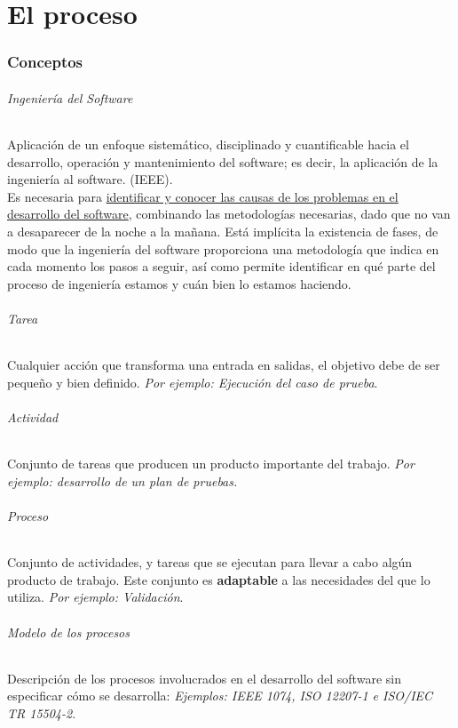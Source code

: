 \part{El proceso}

\section{Conceptos}

\paragraph{Ingeniería del Software} Aplicación de un enfoque sistemático, disciplinado y cuantificable hacia el desarrollo, operación y mantenimiento del software; es decir, la aplicación de la ingeniería al software. (IEEE).\\

Es necesaria para \uline{identificar y conocer las causas de los problemas en el desarrollo del software}, combinando las metodologías necesarias, dado que no van a desaparecer de la noche a la mañana. Está implícita la existencia de fases, de modo que la ingeniería del software proporciona una metodología que indica en cada momento los pasos a seguir, así como permite identificar en qué parte del proceso de ingeniería estamos y cuán bien lo estamos haciendo.

\paragraph{Tarea} Cualquier acción que transforma una entrada en salidas, el objetivo debe de ser pequeño y bien definido. \textit{Por ejemplo: Ejecución del caso de prueba}.


\paragraph{Actividad} Conjunto de tareas que producen un producto importante del trabajo. \textit{Por ejemplo: desarrollo de un plan de pruebas.}

\paragraph{Proceso} Conjunto de actividades, y tareas que se ejecutan para llevar a cabo algún producto de trabajo. Este conjunto es \textbf{adaptable} a las necesidades del que lo utiliza. \textit{Por ejemplo: Validación}.

\paragraph{Modelo de los procesos} Descripción de los procesos involucrados en el desarrollo del software sin especificar cómo se desarrolla: \textit{Ejemplos: IEEE 1074, ISO 12207-1 e ISO/IEC TR 15504-2}.

